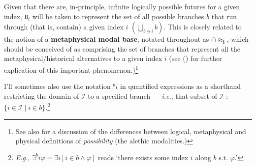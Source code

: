 \documentclass[11pt,dvipsnames]{report}
\begin{document}
\xe


Given that there are, in-principle, infinite logically possible futures for a given index,  $ \mathtt{B}_i $ will be taken to represent the set of all possible branches $ b $ that run through (that is, contain) a given index $ i $ $(\bigcup\limits_{b\scriptstyle\ni i}b)$. This is closely related to the notion of a \textbf{metaphysical modal base}, notated throughout as $ \boldsymbol{\cap{\approx_i}} $, which should be conceived of as comprising the set of branches that represent all the metaphysical/historical alternatives to a given index $ i $ (see () for further explication of this important phenomenon.)\footnote{See also \citet{Rumberg2016a} for a discussion of the differences between logical, metaphysical and physical definitions of \textit{possibility} (the alethic modalities.)}

 I'll sometimes also use the notation $ {}^bi $ in quantified expressions as a shorthand restricting the domain of $ \mathcal I $ to a specified branch --- \textit{i.e.}, that subset of $ \mathcal I $ : $ \{i\in\mathcal I\mid i\in b\} $.\footnote{\textit{E.g.}, $ \exists^bi\varphi=\exists i[i\in b\wedge\varphi]$ reads `there exists some index $ i $ along $ b $ s.t. $ \varphi $.'}
\end{document}
